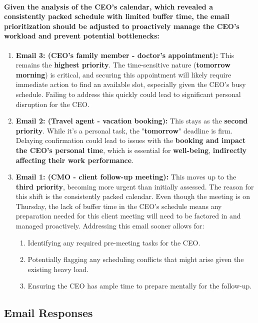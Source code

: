 \documentclass{article}
\begin{document}
\paragraph{Given the analysis of the \textbf{CEO's calendar}, which revealed a consistently packed schedule with limited buffer time, the email prioritization should be adjusted to proactively manage the CEO's workload and prevent potential bottlenecks:}
\begin{enumerate}
    \item \textbf{Email 3: (CEO's family member - doctor's appointment):} This remains the \textbf{highest priority}. The time-sensitive nature (\textbf{tomorrow morning}) is critical, and securing this appointment will likely require immediate action to find an available slot, especially given the CEO's busy schedule. Failing to address this quickly could lead to significant personal disruption for the CEO.
    \item \textbf{Email 2: (Travel agent - vacation booking):} This stays as the \textbf{second priority}. While it's a personal task, the "\textbf{tomorrow}" deadline is firm. Delaying confirmation could lead to issues with the \textbf{booking and impact the CEO's personal time}, which is essential for \textbf{well-being}, \textbf{indirectly affecting their work performance}.
    \item \textbf{Email 1: (CMO - client follow-up meeting):} This moves up to the \textbf{third priority}, becoming more urgent than initially assessed. The reason for this shift is the consistently packed calendar. Even though the meeting is on Thursday, the lack of buffer time in the CEO's schedule means any preparation needed for this client meeting will need to be factored in and managed proactively. Addressing this email sooner allows for:
\begin{enumerate}
    \item Identifying any required pre-meeting tasks for the CEO.
    \item Potentially flagging any scheduling conflicts that might arise given the existing heavy load.
    \item Ensuring the CEO has ample time to prepare mentally for the follow-up.
\end{enumerate}
    

 
\end{enumerate}
\subsection{Email Responses}
\end{document}
